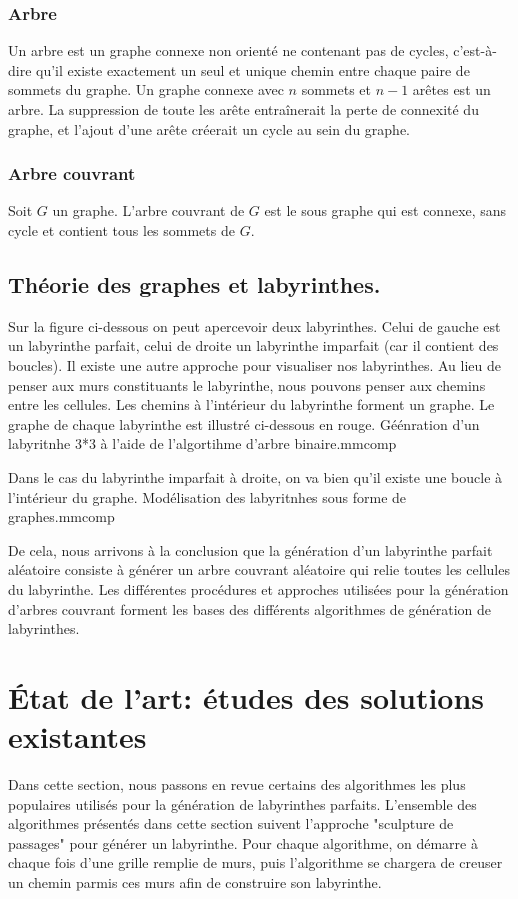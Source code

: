 \subsubsection{Arbre}
Un arbre est un graphe connexe non orienté ne contenant pas de cycles, c'est-à-dire qu'il existe exactement un seul et unique chemin entre chaque paire de sommets du graphe. Un graphe connexe avec $n$ sommets et $n-1$ arêtes est un arbre.
La suppression de toute les arête entraînerait la perte de connexité du graphe, et l'ajout d'une arête créerait un cycle au sein du graphe.

\subsubsection{Arbre couvrant}
Soit $G$ un graphe. L'arbre couvrant de $G$ est le sous graphe qui est connexe, sans cycle et contient tous les sommets de $G$.


\newpage
\subsection{Théorie des graphes et labyrinthes.}
Sur la figure ci-dessous on peut apercevoir deux labyrinthes. Celui de gauche est un labyrinthe parfait, celui de droite un labyrinthe imparfait (car il contient des boucles). Il existe une autre approche pour visualiser nos labyrinthes. Au lieu de penser aux murs constituants le labyrinthe, nous pouvons penser aux chemins entre les cellules. 
Les chemins à l'intérieur du labyrinthe forment un graphe. Le graphe de chaque labyrinthe est illustré ci-dessous en rouge. \newline
{}
{Géénration d'un labyritnhe 3*3 à l'aide de l'algortihme d'arbre binaire.}{mmcomp}


Dans le cas du labyrinthe imparfait à droite, on va bien qu'il existe une boucle à l'intérieur du graphe.
{Modélisation des labyritnhes sous forme de graphes.}{mmcomp}

De cela, nous arrivons à la conclusion que la génération d'un labyrinthe parfait aléatoire consiste à générer un arbre couvrant aléatoire qui relie toutes les cellules du labyrinthe.
Les différentes procédures et approches utilisées pour la génération d'arbres couvrant forment les bases des différents algorithmes de génération de labyrinthes. 


\section{État de l’art: études des solutions existantes} \label{sec:etatDeLart2}
Dans cette section, nous passons en revue certains des algorithmes les plus populaires utilisés pour la génération de labyrinthes parfaits.
L'ensemble des algorithmes présentés dans cette section suivent l'approche "sculpture de passages" pour générer un labyrinthe. Pour chaque algorithme, on démarre à chaque fois d'une grille remplie de murs, puis l'algorithme se chargera de creuser un chemin parmis ces murs afin de construire son labyrinthe. 
